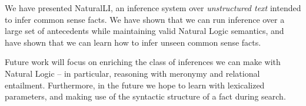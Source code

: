 We have presented NaturalLI, an inference system over
  \textit{unstructured text} intended to infer common sense facts.
We have shown that we can run inference over a large set of antecedents
  while maintaining valid Natural Logic semantics, and have shown that
  we can learn how to infer unseen common sense facts.

Future work will focus on enriching the class of inferences we can
  make with Natural Logic -- in particular, reasoning with meronymy
  and relational entailment.
Furthermore, in the future we hope to learn with lexicalized parameters,
  and making use of the syntactic structure of a fact during search.
